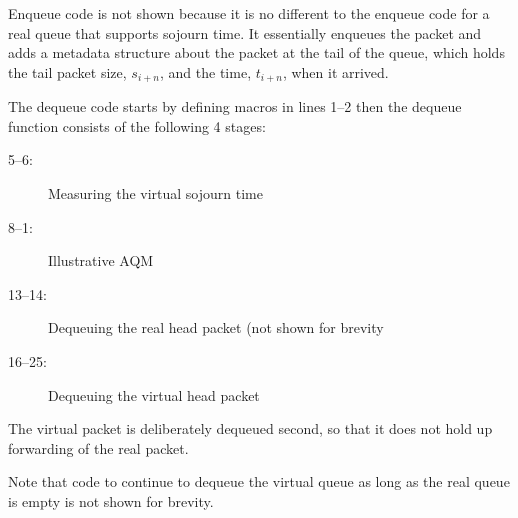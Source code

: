 Enqueue code is not shown because it is no different to the enqueue code for a real queue that supports sojourn time. It essentially enqueues the packet and adds a metadata structure about the packet at the tail of the queue, which holds the tail packet size, \(s_{i+n}\), and the time, \(t_{i+n}\), when it arrived.

The dequeue code starts by defining macros in lines 1--2 then the dequeue function consists of the following 4 stages:
\begin{description}
	\item[5--6:] Measuring the virtual sojourn time
	\item[8--1:] Illustrative AQM
	\item[13--14:] Dequeuing the real head packet (not shown for brevity
	\item[16--25:] Dequeuing the virtual head packet
\end{description}
The virtual packet is deliberately dequeued second, so that it does not hold up forwarding of the real packet.

Note that code to continue to dequeue the virtual queue as long as the real queue is empty is not shown for brevity.

